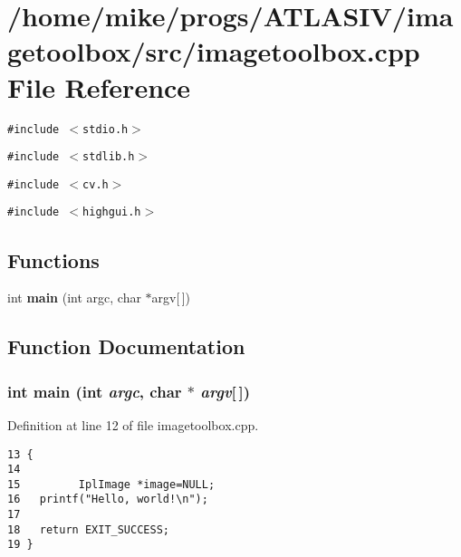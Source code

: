 \section{/home/mike/progs/ATLASIV/imagetoolbox/src/imagetoolbox.cpp File Reference}
\label{imagetoolbox_8cpp}
{\tt \#include $<$stdio.h$>$}\par
{\tt \#include $<$stdlib.h$>$}\par
{\tt \#include $<$cv.h$>$}\par
{\tt \#include $<$highgui.h$>$}\par
\subsection*{Functions}
\begin{CompactItemize}
\item 
int {\bf main} (int argc, char $\ast$argv[$\,$])
\end{CompactItemize}


\subsection{Function Documentation}
\subsubsection{\setlength{\rightskip}{0pt plus 5cm}int main (int {\em argc}, char $\ast$ {\em argv}[$\,$])}\label{imagetoolbox_8cpp_a0}


Definition at line 12 of file imagetoolbox.cpp.

\footnotesize\begin{verbatim}13 {
14 
15         IplImage *image=NULL;
16   printf("Hello, world!\n");
17 
18   return EXIT_SUCCESS;
19 }
\end{verbatim}\normalsize 


